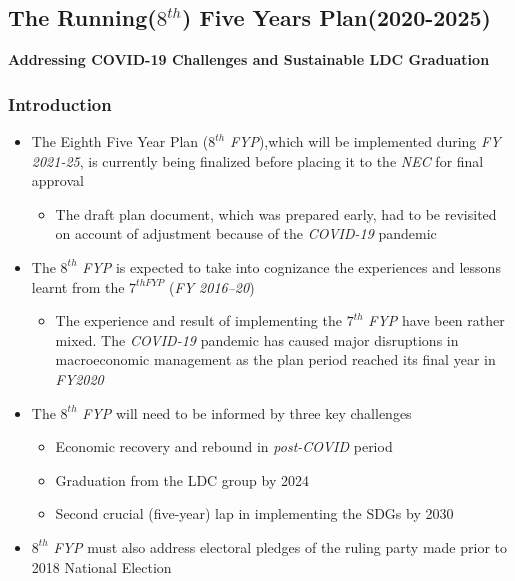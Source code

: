 \subsection{The Running($8^{th}$) Five Years Plan(2020-2025)}
\textbf{Addressing COVID-19 Challenges and Sustainable LDC Graduation}
\subsubsection{Introduction}
\begin{itemize}
	\item The Eighth Five Year Plan ($8^{th}$ \textit{FYP}),which will be implemented during 
	\textit{FY 2021-25}, is currently being finalized before placing it to the \textit{NEC} for final approval
	\begin{itemize}
		\item The draft plan document, which was prepared early, had to be revisited on account 
		of adjustment because of the \textit{COVID-19} pandemic
	\end{itemize}
	
	\item The $8^{th}$ \textit{FYP} is expected to take into cognizance the experiences and lessons 
	learnt from the $7^{th FYP}$ (\textit{FY 2016–20})
	\begin{itemize}
		\item The experience and result of implementing the $7^{th}$ \textit{FYP} have been rather mixed. 
		The \textit{COVID-19} pandemic has caused major disruptions in macroeconomic management as 
		the plan period reached its final year in \textit{FY2020}
	\end{itemize}
	
	\item The $8^{th}$ \textit{FYP} will need to be informed by three key challenges
	\begin{itemize}
		\item Economic recovery and rebound in \textit{post-COVID} period
		\item Graduation from the LDC group by 2024
		\item Second crucial (five-year) lap in implementing the SDGs by 2030
	\end{itemize}
	
	\item $8^{th}$ \textit{FYP} must also address electoral pledges of the ruling 
	party made prior to 2018 National Election
	
\end{itemize}


